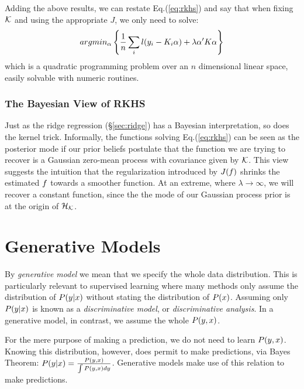 Adding the above results, we can restate Eq.(\ref{eq:rkhs}) and say that when fixing $\mathcal{K}$ and using the appropriate $J$, we only need to solve: 
\begin{align}	
\label{eq:rkhs_simple}
		argmin_{\alpha}\left\{ \frac{1}{n} \sum_i l(y_i-K_i \alpha) + \lambda \alpha' K \alpha  \right\}
\end{align}
which is a quadratic programming problem over an $n$ dimensional linear space, easily solvable with numeric routines.


\subsection{The Bayesian View of RKHS}
Just as the ridge regression (\S\ref{sec:ridge}) has a Bayesian interpretation, so does the kernel trick.
Informally, the functions solving Eq.(\ref{eq:rkhs}) can be seen as the posterior mode if our prior beliefs postulate that the function we are trying to recover is a Gaussian zero-mean process with covariance given by $\mathcal{K}$.
This view suggests the intuition that the regularization introduced by $J(f)$ shrinks the estimated $f$ towards a smoother function. At an extreme, where $\lambda\to\infty$, we will recover a constant function, since the the mode of our Gaussian process prior is at the origin of $\mathcal{H}_{\mathcal{K}}$.





\chapter{Generative Models}
\label{apx:generative_concept}

By \emph{generative model} we mean that we specify the whole data distribution. This is particularly relevant to supervised learning where many methods only assume the distribution of $P(y|x)$ without stating the distribution of $P(x)$.
Assuming only $P(y|x)$ is known as a \emph{discriminative model}, or \emph{discriminative analysis}.
In a generative model, in contrast, we assume the whole $P(y,x)$.

For the mere purpose of making a prediction, we do not need to learn $P(y,x)$. 
Knowing this distribution, however, does permit to make predictions, via Bayes Theorem: 
$P(y|x)=\frac{P(y,x)}{\int P(y,x)dy}$.
Generative models make use of this relation to make predictions. 

